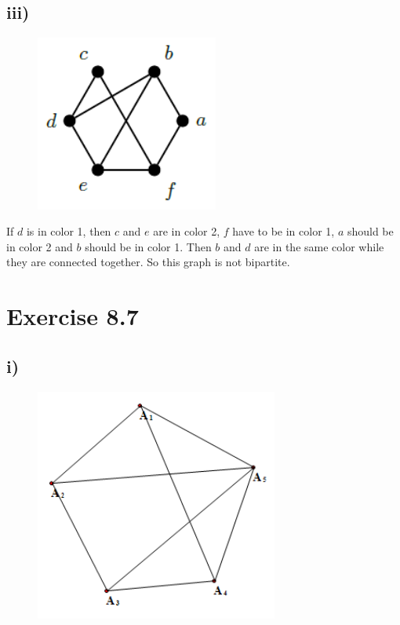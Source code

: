 \documentclass[a4paper,12pt,titlepage]{article}
\begin{document}
\subsection*{iii)}
\begin{figure}[H]
    \centering
    \includegraphics[width=6cm]{6.png}
\end{figure}
If $d$ is in color 1, then $c$ and $e$ are in color 2, $f$ have to be  in color 1, $a$ should be in color 2 and $b$ should be in color 1. Then $b$ and $d$ are in the same color while they are connected together. So this graph is not bipartite. 

\section*{Exercise 8.7}
\subsection*{i)}
\begin{figure}[H]
    \centering
    \includegraphics[width=8cm]{7.png}
\end{figure}
\end{document}
